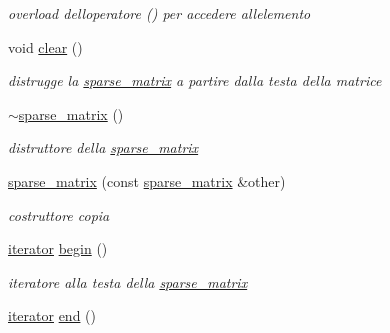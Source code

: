 \begin{DoxyCompactItemize}
\begin{DoxyCompactList}\small\item\em overload dell\textquotesingle{}operatore () per accedere all\textquotesingle{}elemento \end{DoxyCompactList}\item 
\mbox{\label{classsparse__matrix_a75f0a827b9de8d48b09a4e72311b6dbe}} 
void \hyperlink{classsparse__matrix_a75f0a827b9de8d48b09a4e72311b6dbe}{clear} ()
\begin{DoxyCompactList}\small\item\em distrugge la \hyperlink{classsparse__matrix}{sparse\+\_\+matrix} a partire dalla testa della matrice \end{DoxyCompactList}\item 
\mbox{\label{classsparse__matrix_a376c1d4abca1efa1ffa3c346ea82036d}} 
\hyperlink{classsparse__matrix_a376c1d4abca1efa1ffa3c346ea82036d}{$\sim$sparse\+\_\+matrix} ()
\begin{DoxyCompactList}\small\item\em distruttore della \hyperlink{classsparse__matrix}{sparse\+\_\+matrix} \end{DoxyCompactList}\item 
\hyperlink{classsparse__matrix_a5b77defd06a5911cf8d7f4b2a658a1d9}{sparse\+\_\+matrix} (const \hyperlink{classsparse__matrix}{sparse\+\_\+matrix} \&other)
\begin{DoxyCompactList}\small\item\em costruttore copia \end{DoxyCompactList}\item 
\mbox{\label{classsparse__matrix_ac608462a8e4ceba67e51c99bd3befcf5}} 
\hyperlink{classsparse__matrix_1_1iterator}{iterator} \hyperlink{classsparse__matrix_ac608462a8e4ceba67e51c99bd3befcf5}{begin} ()
\begin{DoxyCompactList}\small\item\em iteratore alla testa della \hyperlink{classsparse__matrix}{sparse\+\_\+matrix} \end{DoxyCompactList}\item 
\mbox{\label{classsparse__matrix_a7fbde155ed4c25b38b5005e7d83c6180}} 
\hyperlink{classsparse__matrix_1_1iterator}{iterator} \hyperlink{classsparse__matrix_a7fbde155ed4c25b38b5005e7d83c6180}{end} ()

\end{DoxyCompactItemize}
